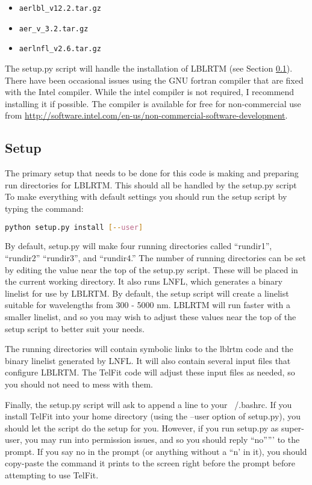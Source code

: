 \documentclass{article}
\begin{document}
\begin{itemize}
\item \verb|aerlbl_v12.2.tar.gz|
\item \verb|aer_v_3.2.tar.gz|
\item \verb|aerlnfl_v2.6.tar.gz|
\end{itemize}

The setup.py script will handle the installation of LBLRTM (see Section \ref{sec:setup}). There have been occasional issues using the GNU fortran compiler that are fixed with the Intel compiler. While the intel compiler is not required, I recommend installing it if possible. The compiler is available for free for non-commercial use from \url{http://software.intel.com/en-us/non-commercial-software-development}.



\subsection{Setup}
\label{sec:setup}

The primary setup that needs to be done for this code is making and preparing run directories for LBLRTM. This should all be handled by the setup.py script To make everything with default settings you should run the setup script by typing the command:
\begin{lstlisting}[language=bash]
   python setup.py install [--user]
\end{lstlisting}

By default, setup.py will make four running directories called ``rundir1'', ``rundir2'' ``rundir3'', and ``rundir4.'' The number of running directories can be set by editing the value near the top of the setup.py script. These will be placed in the current working directory.  It also runs LNFL, which generates a binary linelist for use by LBLRTM. By default, the setup script will create a linelist suitable for wavelengths from 300 - 5000 nm. LBLRTM will run faster with a smaller linelist, and so you may wish to adjust these values near the top of the setup script to better suit your needs.

The running directories will contain symbolic links to the lblrtm code and the binary linelist generated by LNFL. It will also contain several input files that configure LBLRTM. The TelFit code will adjust these input files as needed, so you should not need to mess with them.

Finally, the setup.py script will ask to append a line to your ~/.bashrc. If you install TelFit into your home directory (using the --user option of setup.py), you should let the script do the setup for you. However, if you run setup.py as super-user, you may run into permission issues, and so you should reply ``no''''' to the prompt. If you say no in the prompt (or anything without a ``n' in it), you should copy-paste the command it prints to the screen right before the prompt before attempting to use TelFit. 
\end{document}
